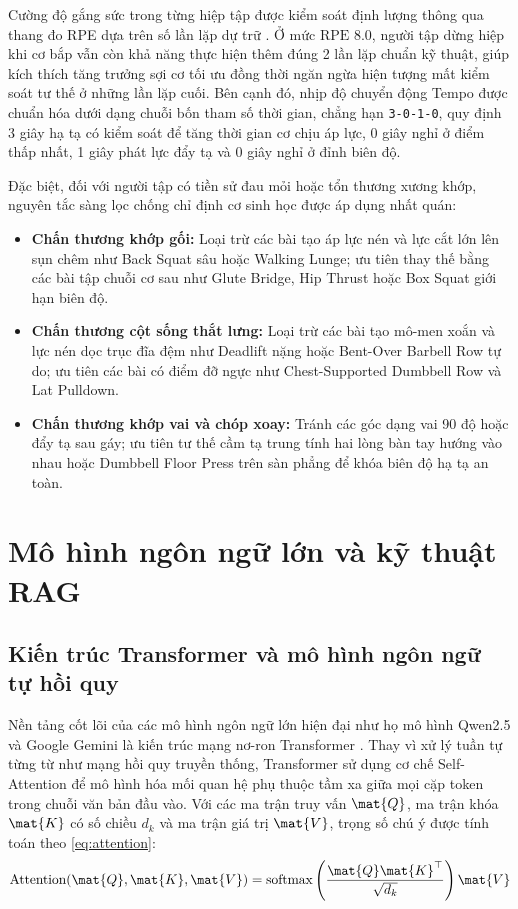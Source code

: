 Cường độ gắng sức trong từng hiệp tập được kiểm soát định lượng thông qua thang đo RPE dựa trên số lần lặp dự trữ \cite{helms2016rpe}. Ở mức $\text{RPE } 8.0$, người tập dừng hiệp khi cơ bắp vẫn còn khả năng thực hiện thêm đúng 2 lần lặp chuẩn kỹ thuật, giúp kích thích tăng trưởng sợi cơ tối ưu đồng thời ngăn ngừa hiện tượng mất kiểm soát tư thế ở những lần lặp cuối. Bên cạnh đó, nhịp độ chuyển động Tempo được chuẩn hóa dưới dạng chuỗi bốn tham số thời gian, chẳng hạn \texttt{3-0-1-0}, quy định 3 giây hạ tạ có kiểm soát để tăng thời gian cơ chịu áp lực, 0 giây nghỉ ở điểm thấp nhất, 1 giây phát lực đẩy tạ và 0 giây nghỉ ở đỉnh biên độ.

Đặc biệt, đối với người tập có tiền sử đau mỏi hoặc tổn thương xương khớp, nguyên tắc sàng lọc chống chỉ định cơ sinh học được áp dụng nhất quán:
\begin{itemize}[leftmargin=1.5cm, itemsep=4pt, topsep=4pt]
    \item \textbf{Chấn thương khớp gối:} Loại trừ các bài tạo áp lực nén và lực cắt lớn lên sụn chêm như Back Squat sâu hoặc Walking Lunge; ưu tiên thay thế bằng các bài tập chuỗi cơ sau như Glute Bridge, Hip Thrust hoặc Box Squat giới hạn biên độ.
    \item \textbf{Chấn thương cột sống thắt lưng:} Loại trừ các bài tạo mô-men xoắn và lực nén dọc trục đĩa đệm như Deadlift nặng hoặc Bent-Over Barbell Row tự do; ưu tiên các bài có điểm đỡ ngực như Chest-Supported Dumbbell Row và Lat Pulldown.
    \item \textbf{Chấn thương khớp vai và chóp xoay:} Tránh các góc dạng vai 90 độ hoặc đẩy tạ sau gáy; ưu tiên tư thế cầm tạ trung tính hai lòng bàn tay hướng vào nhau hoặc Dumbbell Floor Press trên sàn phẳng để khóa biên độ hạ tạ an toàn.
\end{itemize}

\section{Mô hình ngôn ngữ lớn và kỹ thuật RAG}
\label{sec:llm_rag}

\subsection{Kiến trúc Transformer và mô hình ngôn ngữ tự hồi quy}
\label{subsec:transformer_llm}

Nền tảng cốt lõi của các mô hình ngôn ngữ lớn hiện đại như họ mô hình Qwen2.5 và Google Gemini là kiến trúc mạng nơ-ron Transformer \cite{vaswani2017attention}. Thay vì xử lý tuần tự từng từ như mạng hồi quy truyền thống, Transformer sử dụng cơ chế Self-Attention để mô hình hóa mối quan hệ phụ thuộc tầm xa giữa mọi cặp token trong chuỗi văn bản đầu vào. Với các ma trận truy vấn $\mat{Q}$, ma trận khóa $\mat{K}$ có số chiều $d_k$ và ma trận giá trị $\mat{V}$, trọng số chú ý được tính toán theo \cref{eq:attention}:
\begin{equation}
    \text{Attention}(\mat{Q}, \mat{K}, \mat{V}) = \text{softmax}\left(\frac{\mat{Q}\mat{K}^{\top}}{\sqrt{d_k}}\right)\mat{V}
    \label{eq:attention}
\end{equation}

